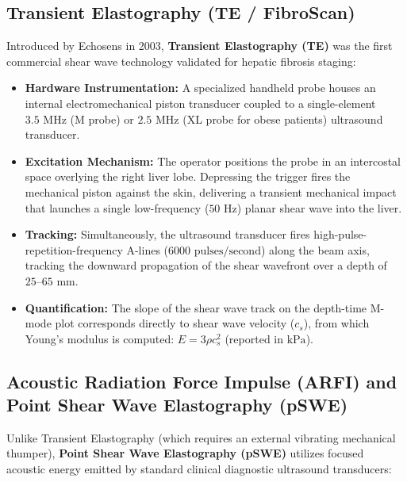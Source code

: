 \documentclass[11pt,a4paper]{article}
\begin{document}
\subsection{Transient Elastography (TE / FibroScan)}
Introduced by Echosens in 2003, \textbf{Transient Elastography (TE)} was the first commercial shear wave technology validated for hepatic fibrosis staging:
\begin{itemize}[leftmargin=2em]
    \item \textbf{Hardware Instrumentation:} A specialized handheld probe houses an internal electromechanical piston transducer coupled to a single-element $3.5\text{ MHz}$ (M probe) or $2.5\text{ MHz}$ (XL probe for obese patients) ultrasound transducer.
    \item \textbf{Excitation Mechanism:} The operator positions the probe in an intercostal space overlying the right liver lobe. Depressing the trigger fires the mechanical piston against the skin, delivering a transient mechanical impact that launches a single low-frequency ($50\text{ Hz}$) planar shear wave into the liver.
    \item \textbf{Tracking:} Simultaneously, the ultrasound transducer fires high-pulse-repetition-frequency A-lines ($6000\text{ pulses/second}$) along the beam axis, tracking the downward propagation of the shear wavefront over a depth of $25\text{--}65\text{ mm}$.
    \item \textbf{Quantification:} The slope of the shear wave track on the depth-time M-mode plot corresponds directly to shear wave velocity ($c_s$), from which Young's modulus is computed: $E = 3\rho c_s^2$ (reported in $\text{kPa}$).
\end{itemize}

\subsection{Acoustic Radiation Force Impulse (ARFI) and Point Shear Wave Elastography (pSWE)}
Unlike Transient Elastography (which requires an external vibrating mechanical thumper), \textbf{Point Shear Wave Elastography (pSWE)} utilizes focused acoustic energy emitted by standard clinical diagnostic ultrasound transducers:
\end{document}
